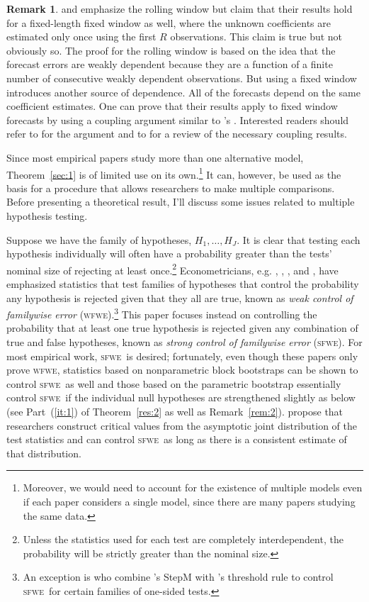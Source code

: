 \documentclass[10pt,fleqn,draft]{article}
\newcommand\citepos[2][]{\citeauthor{#2}'s \citeyearpar[#1]{#2}}
\theoremstyle{definition}
\newtheorem{rem}{Remark}
\newcommand{\sfwe}{\textsc{sfwe}}
\newcommand{\wfwe}{\textsc{wfwe}}
\begin{document}
\begin{rem}
  \citet{GiW:06} and \citet{ClW:06,ClW:07} emphasize the rolling
  window but claim that their results hold for a fixed-length fixed
  window as well, where the unknown coefficients are estimated only
  once using the first $R$ observations.  This claim is true but not
  obviously so.  The proof for the rolling window is based on the idea
  that the forecast errors are weakly dependent because they are a
  function of a finite number of consecutive weakly dependent
  observations.  But using a fixed window introduces another source of
  dependence.  All of the forecasts depend on the same coefficient
  estimates.  One can prove that their results apply to fixed window
  forecasts by using a coupling argument similar to \citepos{Cal:11}.
  Interested readers should refer to \citet{Cal:11} for the argument
  and to \citet{MeP:02} for a review of the necessary coupling
  results.
\end{rem}

Since most empirical papers study more than one alternative model,
Theorem~\ref{sec:1} is of limited use on its own.\footnote{Moreover,
  we would need to account for the existence of multiple models even if
each paper considers a single model, since there are many papers
studying the same data.}  It can, however, be
used as the basis for a procedure that allows researchers to make
multiple comparisons.  Before presenting a theoretical result, I'll
discuss some issues related to multiple hypothesis testing.

Suppose we have the family of hypotheses, $H_1,\dots,H_J$.  It is
clear that testing each hypothesis individually will often have a
probability greater than the tests' nominal size of rejecting at least
once.\footnote{Unless the statistics used for each test are completely
  interdependent, the probability will be strictly greater than the
  nominal size.}  Econometricians, e.g. \citet{Whi:00},
\citet{Han:05}, \cite{HuW:10}, and \citet{ClM:11}, have emphasized
statistics that test families of hypotheses that control the
probability any hypothesis is rejected given that they all are true,
known as \textit{weak control of familywise error}
(\wfwe).\footnote{An exception is \citet{HHK:10} who combine
  \citepos{RoW:05} StepM with \citepos{Han:05} threshold rule to
  control \sfwe\ for certain families of one-sided tests.}  This paper
focuses instead on controlling the probability that at least one true
hypothesis is rejected given any combination of true and false
hypotheses, known as \textit{strong control of familywise error}
(\sfwe).  For most empirical work, \sfwe\ is desired; fortunately,
even though these papers only prove \wfwe, statistics based on
nonparametric block bootstraps \citep{Whi:00,Han:05} can be shown to
control \sfwe\ as well \citep[this follows directly from][]{RoW:05}
and those based on the parametric bootstrap \citep{ClM:11} essentially
control \sfwe\ if the individual null hypotheses are strengthened
slightly as below (see Part~(\ref{it:1}) of Theorem~\ref{res:2} as
well as Remark~\ref{rem:2}).  \citet{HuW:10} propose that researchers
construct critical values from the asymptotic joint distribution of
the test statistics and can control \sfwe\ as long as there is a
consistent estimate of that distribution.
\end{document}
